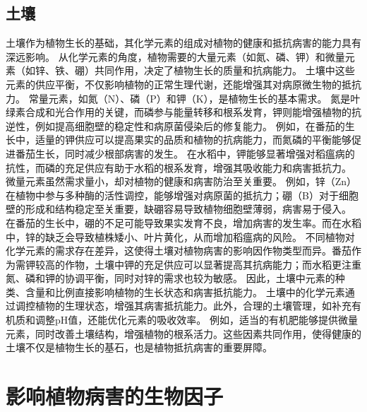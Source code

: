 \documentclass[AutoFakeBold]{LZUThesis-PgD&PhD}
\begin{document}
	\subsection{土壤}
	土壤作为植物生长的基础，其化学元素的组成对植物的健康和抵抗病害的能力具有深远影响。
	从化学元素的角度，植物需要的大量元素（如氮、磷、钾）和微量元素（如锌、铁、硼）共同作用，决定了植物生长的质量和抗病能力。
	土壤中这些元素的供应平衡，不仅影响植物的正常生理代谢，还能增强其对病原微生物的抵抗力。
	常量元素，如氮（N）、磷（P）和钾（K），是植物生长的基本需求。
	氮是叶绿素合成和光合作用的关键，而磷参与能量转移和根系发育，钾则能增强植物的抗逆性，例如提高细胞壁的稳定性和病原菌侵染后的修复能力。
	例如，在番茄的生长中，适量的钾供应可以提高果实的品质和植物的抗病能力，而氮磷的平衡能够促进番茄生长，同时减少根部病害的发生。
	在水稻中，钾能够显著增强对稻瘟病的抗性，而磷的充足供应有助于水稻的根系发育，增强其吸收能力和病害抵抗力。
	微量元素虽然需求量小，却对植物的健康和病害防治至关重要。
	例如，锌（Zn）在植物中参与多种酶的活性调控，能够增强对病原菌的抵抗力；硼（B）对于细胞壁的形成和结构稳定至关重要，缺硼容易导致植物细胞壁薄弱，病害易于侵入。
	在番茄的生长中，硼的不足可能导致果实发育不良，增加病害的发生率。而在水稻中，锌的缺乏会导致植株矮小、叶片黄化，从而增加稻瘟病的风险。
	不同植物对化学元素的需求存在差异，这使得土壤对植物病害的影响因作物类型而异。番茄作为需钾较高的作物，土壤中钾的充足供应可以显著提高其抗病能力；而水稻更注重氮、磷和钾的协调平衡，同时对锌的需求也较为敏感。
	因此，土壤中元素的种类、含量和比例直接影响植物的生长状态和病害抵抗能力。
	土壤中的化学元素通过调控植物的生理状态，增强其病害抵抗能力。此外，合理的土壤管理，如补充有机质和调整pH值，还能优化元素的吸收效率。
	例如，适当的有机肥能够提供微量元素，同时改善土壤结构，增强植物的根系活力。这些因素共同作用，使得健康的土壤不仅是植物生长的基石，也是植物抵抗病害的重要屏障。
	
	\section{影响植物病害的生物因子}
	
\end{document}
